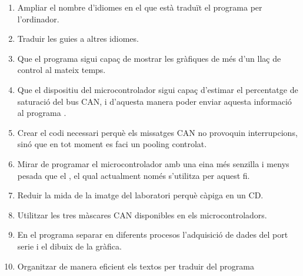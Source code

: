 \begin{enumerate}
	\item Ampliar el nombre d'idiomes en el que està traduït el programa per l'ordinador.
	\item Traduir les guies a altres idiomes.
	\item Que el programa \DCSMonitor sigui capaç de mostrar les gràfiques de més d'un llaç de control al mateix temps.
	\item Que el dispositiu \Monitor del microcontrolador sigui capaç d'estimar el percentatge de saturació del bus CAN, i d'aquesta manera poder enviar aquesta informació al programa \DCSMonitor.
	\item Crear el codi necessari perquè els missatges CAN no provoquin interrupcions, sinó que en tot moment es faci un pooling controlat.
	\item Mirar de programar el microcontrolador amb una eina més senzilla i menys pesada que el \MplabX, el qual actualment només s'utilitza per aquest fi.
	\item Reduir la mida de la imatge del laboratori perquè càpiga en un CD.
	\item Utilitzar les tres màscares CAN disponibles en els microcontroladors.
	\item En el programa \DCSMonitor separar en diferents procesos l'adquisició de dades del port serie i el dibuix de la gràfica.
	\item Organitzar de manera eficient els textos per traduir del programa \DCSMonitor
\end{enumerate}





 






